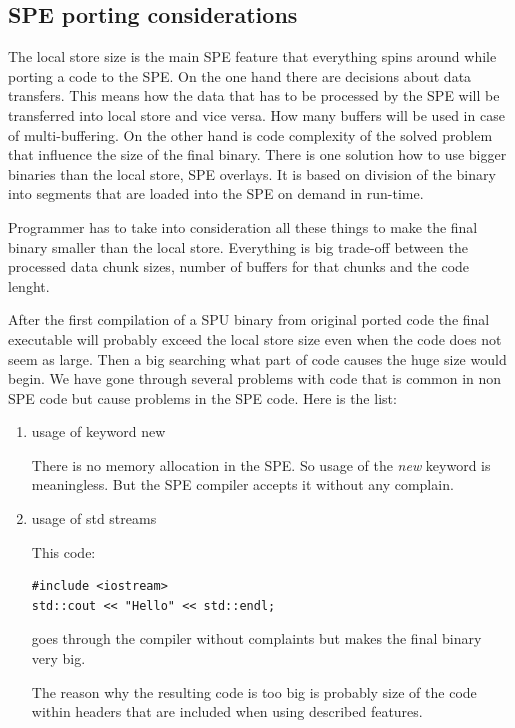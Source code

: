 \subsection {SPE porting considerations}

\par
The local store size is the main SPE feature that everything spins around while porting a code to the SPE.
On the one hand there are decisions about data transfers.
This means how the data that has to be processed by the SPE will be transferred into local store and vice versa.
How many buffers will be used in case of multi-buffering.
On the other hand is code complexity of the solved problem that influence the size of the final binary.
There is one solution how to use bigger binaries than the local store, SPE overlays.
It is based on division of the binary into segments that are loaded into the SPE on demand in run-time.

\par
Programmer has to take into consideration all these things to make the final binary smaller than the local store.
Everything is big trade-off between the processed data chunk sizes, number of buffers for that chunks and the code lenght.

\par
After the first compilation of a SPU binary from original ported code the final executable will probably exceed the local store size even when the code does not seem as large.
Then a big searching what part of code causes the huge size would begin.
We have gone through several problems with code that is common in non SPE code but cause problems in the SPE code.
Here is the list:
\begin{enumerate}
\item usage of keyword new
\par
There is no memory allocation in the SPE. 
So usage of the \emph{new} keyword is meaningless.
But the SPE compiler accepts it without any complain.

\item usage of std streams
\par
This code:
\begin{verbatim}
#include <iostream>
std::cout << "Hello" << std::endl;
\end{verbatim}
goes through the compiler without complaints but makes the final binary very big.

\par
The reason why the resulting code is too big is probably size of the code within headers that are included when using described features.

\end{enumerate}

